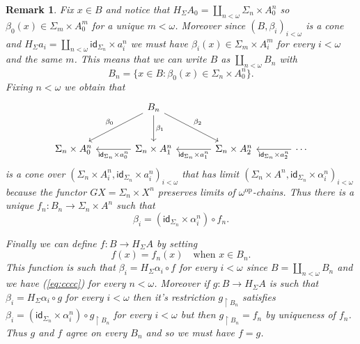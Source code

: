 \documentclass[letterpaper, 11pt, oneside]{memoir}
\theoremstyle{myteo}
\newtheorem{remark}[theorem]{Remark}
\numberwithin{equation}{section}
\newcommand{\id}{\textsf{id}}
\newcommand{\op}{\text{op}}
\begin{document}
\begin{remark}
  Fix \(x \in B\) and notice that \(H_\Sigma A_0 = \coprod_{n<\omega} \Sigma_n \times A_0^n\) so \(\beta_0(x) \in \Sigma_m \times A_0^m\) for a unique \(m < \omega\).
  Moreover since \((B, \beta_i)_{i<\omega}\) is a cone and \(H_\Sigma a_i = \coprod_{n<\omega}\id_{\Sigma_n} \times a_i^n\) we must have \(\beta_i(x) \in \Sigma_m \times A_i^m\) for every \(i<\omega\) and the same \(m\).
  This means that we can write \(B\) as \(\coprod_{n<\omega}B_n\) with
  \begin{equation*}
    B_n = \{x \in B: \beta_0(x) \in \Sigma_n \times A_0^n\}.
  \end{equation*}
  Fixing \(n < \omega\) we obtain that
  \begin{equation*}
    \begin{tikzcd}[sep = large]
      & B_n \ar[dl, "\beta_0"'] \ar[d, "\beta_1"] \ar[dr, "\beta_2"] & & \\
      \Sigma_n \times A_0^n & \Sigma_n \times A_1^n \ar[l, "\id_{\Sigma_n} \times a_0^n"] & \Sigma_n \times A_2^n \ar[l, "\id_{\Sigma_n} \times a_1^n"] & \cdots \ar[l, "\id_{\Sigma_n} \times a_2^n"]
    \end{tikzcd}
  \end{equation*}
  is a cone over \((\Sigma_n \times A_i^n, \id_{\Sigma_n} \times a_i^n)_{i<\omega}\) that has limit \((\Sigma_n \times A^n, \id_{\Sigma_n} \times \alpha_i^n)_{i<\omega}\) because the functor \(GX = \Sigma_n \times X^n\) preserves limits of \(\omega^\op\)-chains.
  Thus there is a unique \(f_n:B_n \to \Sigma_n \times A^n\) such that
  \begin{equation}
    \label{eq:cccc}
    \beta_i = (\id_{\Sigma_n} \times \alpha_i^n) \circ f_n.
  \end{equation}

  Finally we can define \(f: B \to H_\Sigma A\) by setting
  \begin{equation*}
    f(x) = f_n(x) \quad \text{when \(x \in B_n\)}.
  \end{equation*}
  This function is such that \(\beta_i = H_\Sigma \alpha_i \circ f\) for every \(i < \omega\) since \(B = \coprod_{n < \omega}B_n\) and we have (\ref{eq:cccc}) for every \(n < \omega\).
  Moreover if \(g : B \to H_\Sigma A\) is such that \(\beta_i = H_\Sigma \alpha_i \circ g\) for every \(i < \omega\) then it's restriction \(g_{\upharpoonright B_n}\) satisfies \(\beta_i = (\id_{\Sigma_n} \times \alpha_i^n) \circ g_{\upharpoonright B_n}\) for every \(i < \omega\) but then \(g_{\upharpoonright B_n} = f_n\) by uniqueness of \(f_n\).
  Thus \(g\) and \(f\) agree on every \(B_n\) and so we must have \(f = g\).
\end{remark}
\end{document}
